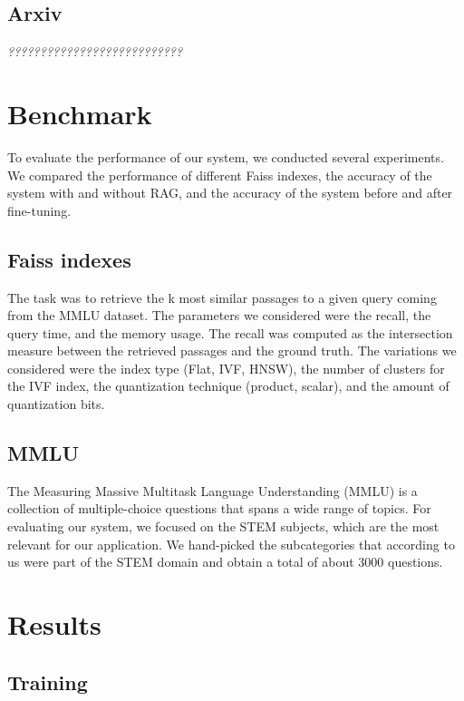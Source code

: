 \documentclass[11pt]{article}
\begin{document}
\subsection{Arxiv}

\textit{???????????????????????????}

\section{Benchmark}

To evaluate the performance of our system, we conducted several experiments.
We compared the performance of different Faiss indexes, the accuracy of the system with and without RAG,
and the accuracy of the system before and after fine-tuning.

\subsection{Faiss indexes}

The task was to retrieve the k most similar passages to a
given query coming from the MMLU dataset.
The parameters we considered were the recall, the query time, 
and the memory usage. 
The recall was computed as the intersection measure between the retrieved 
passages and the ground truth. 
The variations we considered were the index type (Flat, IVF, HNSW), the number 
of clusters for the IVF index, the quantization technique (product, scalar), and
the amount of quantization bits.

\subsection{MMLU}

The Measuring Massive Multitask Language Understanding (MMLU) is a collection of 
multiple-choice questions that spans a wide range of topics.
For evaluating our system, we focused on the STEM subjects, which are the most
relevant for our application.
We hand-picked the subcategories that according to us were part of the STEM domain and
obtain a total of about 3000 questions.

\section{Results}

\subsection{Training}
\end{document}
